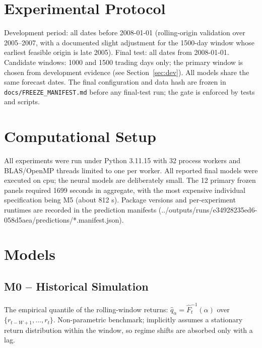 \documentclass[11pt]{article}
\begin{document}
\section{Experimental Protocol}
Development period: all dates before 2008-01-01 (rolling-origin validation over 2005--2007, with a documented slight adjustment for the 1500-day window whose earliest feasible origin is late 2005). Final test: all dates from 2008-01-01. Candidate windows: 1000 and 1500 trading days only; the primary window is chosen from development evidence (see Section~\ref{sec:dev}). All models share the same forecast dates. The final configuration and data hash are frozen in \texttt{docs/FREEZE\_MANIFEST.md} before any final-test run; the gate is enforced by tests and scripts.

\section{Computational Setup}
All experiments were run under Python 3.11.15 with 32 process workers and BLAS/OpenMP threads limited to one per worker. All reported final models were executed on cpu; the neural models are deliberately small. The 12 primary frozen panels required 1699 seconds in aggregate, with the most expensive individual specification being M5 (about 812 s). Package versions and per-experiment runtimes are recorded in the prediction manifests (../outputs/runs/e34928235ed6-058d5aea/predictions/*.manifest.json).

\section{Models}
\subsection{M0 -- Historical Simulation}
The empirical quantile of the rolling-window returns: $\hat{q}_\alpha = \hat{F}_t^{-1}(\alpha)$ over $\{r_{t-W+1},\dots,r_t\}$. Non-parametric benchmark; implicitly assumes a stationary return distribution within the window, so regime shifts are absorbed only with a lag.
\end{document}
